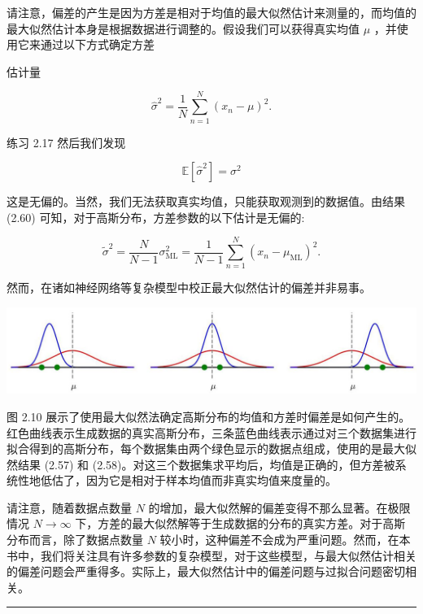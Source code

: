 \documentclass[10pt]{report}
\newcommand{\HRule}{\begin{center}\rule{0.9\linewidth}{0.2mm}\end{center}}
\begin{document}
请注意，偏差的产生是因为方差是相对于均值的最大似然估计来测量的，而均值的最大似然估计本身是根据数据进行调整的。假设我们可以获得真实均值 \(\mu\) ，并使用它来通过以下方式确定方差

估计量

\[
{\widehat{\sigma }}^{2} = \frac{1}{N}\mathop{\sum }\limits_{{n = 1}}^{N}{\left( {x}_{n} - \mu \right) }^{2}. \tag{2.61}
\]

练习 2.17 然后我们发现

\[
\mathbb{E}\left\lbrack  {\widehat{\sigma }}^{2}\right\rbrack   = {\sigma }^{2} \tag{2.62}
\]

这是无偏的。当然，我们无法获取真实均值，只能获取观测到的数据值。由结果 (2.60) 可知，对于高斯分布，方差参数的以下估计是无偏的:

\[
{\widetilde{\sigma }}^{2} = \frac{N}{N - 1}{\sigma }_{\mathrm{{ML}}}^{2} = \frac{1}{N - 1}\mathop{\sum }\limits_{{n = 1}}^{N}{\left( {x}_{n} - {\mu }_{\mathrm{{ML}}}\right) }^{2}. \tag{2.63}
\]

然而，在诸如神经网络等复杂模型中校正最大似然估计的偏差并非易事。

\begin{center}
\includegraphics[max width=1.0\textwidth]{images/0194e279-9b28-703a-88f4-c3ac21e2010d_59_244_343_1304_276_0.jpg}
\end{center}
\hspace*{3em} 

图 2.10 展示了使用最大似然法确定高斯分布的均值和方差时偏差是如何产生的。红色曲线表示生成数据的真实高斯分布，三条蓝色曲线表示通过对三个数据集进行拟合得到的高斯分布，每个数据集由两个绿色显示的数据点组成，使用的是最大似然结果 (2.57) 和 (2.58)。对这三个数据集求平均后，均值是正确的，但方差被系统性地低估了，因为它是相对于样本均值而非真实均值来度量的。

请注意，随着数据点数量 \(N\) 的增加，最大似然解的偏差变得不那么显著。在极限情况 \(N \rightarrow  \infty\) 下，方差的最大似然解等于生成数据的分布的真实方差。对于高斯分布而言，除了数据点数量 \(N\) 较小时，这种偏差不会成为严重问题。然而，在本书中，我们将关注具有许多参数的复杂模型，对于这些模型，与最大似然估计相关的偏差问题会严重得多。实际上，最大似然估计中的偏差问题与过拟合问题密切相关。

\HRule
\end{document}
